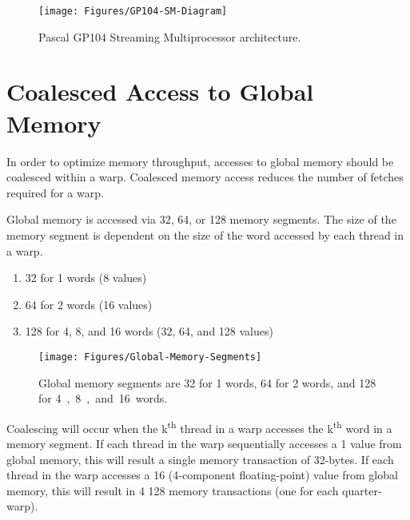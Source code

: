 \begin{figure}[H]
\centering
\texttt{[image: Figures/GP104-SM-Diagram]}
\decoRule
\caption{Pascal GP104 Streaming Multiprocessor architecture.}
\label{fig:GP104-SM-Diagram}
\end{figure}

\section{Coalesced Access to Global Memory}
\label{sec:Coalesced_Access_to_Global_Memory}

In order to optimize memory throughput, accesses to global memory should be coalesced within a warp. Coalesced memory access reduces the number of fetches required for a warp.

Global memory is accessed via \SI{32}{\byte}, \SI{64}{\byte}, or \SI{128}{\byte} memory segments. The size of the memory segment is dependent on the size of the word accessed by each thread in a warp.

\begin{enumerate}
\item{\SI{32}{\byte} for \SI{1}{\byte} words (\SI{8}{\bit} values)}
\item{\SI{64}{\byte} for \SI{2}{\byte} words (\SI{16}{\bit} values)}
\item{\SI{128}{\byte} for \SI{4}{\byte}, \SI{8}{\byte}, and \SI{16}{\byte} words (\SI{32}{\bit}, \SI{64}{\bit}, and \SI{128}{\bit} values)}
\end{enumerate}

\begin{figure}[h]
\centering
\texttt{[image: Figures/Global-Memory-Segments]}
\decoRule
\caption{Global memory segments are \SI{32}{\byte} for \SI{1}{\byte} words, \SI{64}{\byte} for \SI{2}{\byte} words, and \SI{128}{\byte} for \SI{4}, \SI{8}, and \SI{16}{\byte} words.}
\label{fig:Global-Memory-Segments}
\end{figure}

Coalescing will occur when the k\textsuperscript{th} thread in a warp accesses the k\textsuperscript{th} word in a memory segment. If each thread in the warp sequentially accesses a \SI{1}{\byte} value from global memory, this will result a single memory transaction of 32-bytes. If each thread in the warp accesses a \SI{16}{\byte} (4-component floating-point) value from global memory, this will result in 4 \SI{128}{\byte} memory transactions (one for each quarter-warp)\parencite{28_cuda_programming_guide_2016}.

